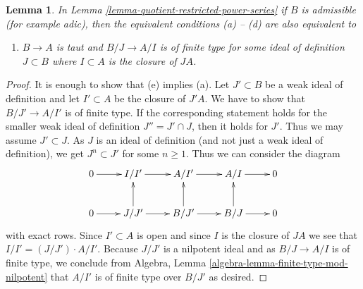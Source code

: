\documentclass{stacks-project}
\theoremstyle{plain}
\newtheorem{lemma}[subsection]{Lemma}
\theoremstyle{definition}
\theoremstyle{remark}
\numberwithin{equation}{subsection}
\begin{document}
\begin{lemma}
\label{lemma-quotient-restricted-power-series-admissible}
In Lemma \ref{lemma-quotient-restricted-power-series}
if $B$ is admissible (for example adic), then the equivalent conditions
(a) -- (d) are also equivalent to
\begin{enumerate}
\item[(e)] $B \to A$ is taut and $B/J \to A/I$ is of finite type for
some ideal of definition $J \subset B$ where $I \subset A$ is
the closure of $JA$.
\end{enumerate}
\end{lemma}

\begin{proof}
It is enough to show that (e) implies (a). Let $J' \subset B$ be a weak ideal
of definition and let $I' \subset A$ be the closure of $J'A$. We have
to show that $B/J' \to A/I'$ is of finite type. If the corresponding statement
holds for the smaller weak ideal of definition $J'' = J' \cap J$, then it
holds for $J'$. Thus we may assume $J' \subset J$. As $J$ is an ideal
of definition (and not just a weak ideal of definition), we get
$J^n \subset J'$ for some $n \geq 1$. Thus we can consider the
diagram
$$
\xymatrix{
0 \ar[r] & I/I' \ar[r] & A/I' \ar[r] & A/I \ar[r] & 0 \\
0 \ar[r] & J/J' \ar[r] \ar[u] & B/J' \ar[r] \ar[u] & B/J \ar[r] \ar[u] & 0
}
$$
with exact rows. Since $I' \subset A$ is open and since
$I$ is the closure of $J A$ we see that $I/I' = (J/J') \cdot A/I'$.
Because $J/J'$ is a nilpotent ideal and as $B/J \to A/I$ is of finite type,
we conclude from Algebra, Lemma \ref{algebra-lemma-finite-type-mod-nilpotent}
that $A/I'$ is of finite type over $B/J'$ as desired.
\end{proof}
\end{document}
